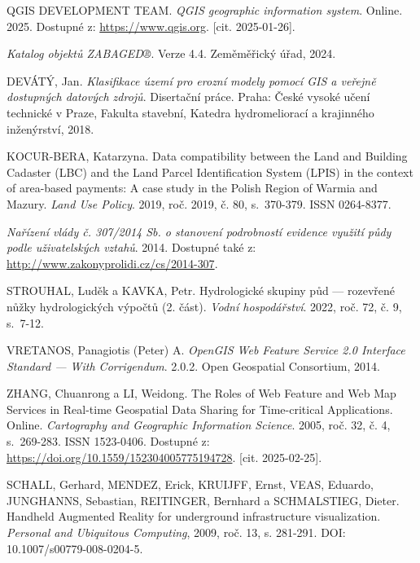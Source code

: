 \documentclass[a4paper,oneside,12pt]{book}
\begin{document}
\begin{thebibliography}{1}
QGIS DEVELOPMENT TEAM. \textit{QGIS geographic information system}. Online. 2025. Dostupné z: \url{https://www.qgis.org}. [cit. 2025-01-26].

\textit{Katalog objektů ZABAGED®}. Verze 4.4. Zeměměřický úřad, 2024.


DEVÁTÝ, Jan. \textit{Klasifikace území pro erozní modely pomocí GIS a veřejně dostupných datových zdrojů}. Disertační práce. Praha: České vysoké učení technické v Praze, Fakulta stavební, Katedra hydromeliorací a krajinného inženýrství, 2018.

KOCUR-BERA, Katarzyna. Data compatibility between the Land and Building Cadaster (LBC) and the Land Parcel Identification System (LPIS) in the context of area-based payments: A case study in the Polish Region of Warmia and Mazury. \textit{Land Use Policy}. 2019, roč. 2019, č. 80, s.~370-379. ISSN 0264-8377.

\textit{Nařízení vlády č. 307/2014 Sb. o stanovení podrobností evidence využití půdy podle uživatelských vztahů}. 2014. Dostupné také z: \url{http://www.zakonyprolidi.cz/cs/2014-307}.

STROUHAL, Luděk a KAVKA, Petr. Hydrologické skupiny půd --- rozevřené nůžky hydrologických výpočtů (2. část). \textit{Vodní hospodářství}. 2022, roč. 72, č. 9, s.~7-12.

VRETANOS, Panagiotis (Peter) A. \textit{OpenGIS Web Feature Service 2.0 Interface Standard --- With Corrigendum}. 2.0.2. Open Geospatial Consortium, 2014.

ZHANG, Chuanrong a LI, Weidong. The Roles of Web Feature and Web Map Services in Real-time Geospatial Data Sharing for Time-critical Applications. Online. \textit{Cartography and Geographic Information Science}. 2005, roč. 32, č. 4, s.~269-283. ISSN 1523-0406. Dostupné z: \url{https://doi.org/10.1559/152304005775194728}. [cit. 2025-02-25].

SCHALL, Gerhard, MENDEZ, Erick, KRUIJFF, Ernst, VEAS, Eduardo, JUNGHANNS, Sebastian, REITINGER, Bernhard a SCHMALSTIEG, Dieter.  
Handheld Augmented Reality for underground infrastructure visualization.  
\textit{Personal and Ubiquitous Computing}, 2009, roč. 13, s. 281-291.  
DOI: 10.1007/s00779-008-0204-5.  

\end{thebibliography}
\end{document}
